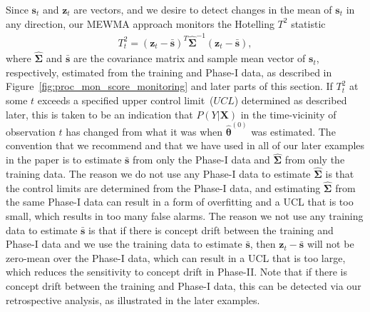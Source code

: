 \documentclass[twoside,11pt]{article}
\begin{document}
Since $\bm{s}_t$ and $\bm{z}_t$ are vectors, and we desire to detect changes in the mean of $\bm{s}_t$ in any direction, our MEWMA approach monitors the Hotelling $T^2$ statistic 
\begin{align}
T_t^2 = (\bm {z}_t-\bar { \bm {s}})^T \widehat {\bm { \Sigma}} ^{-1}(\bm {z}_t-\bar { \bm {s}}),
\label{eqn:hotellingt2}
\end{align}
where $\widehat {\bm { \Sigma}}$ and $\bar {\bm{s}}$ are the covariance matrix and sample mean vector of $\bm {s}_t$, respectively, estimated from the training and Phase-I data, as described in Figure~\ref{fig:proc_mon_score_monitoring} and later parts of this section. If $T_t^2$ at some $t$ exceeds a specified upper control limit~($UCL$) determined as described later, this is taken to be an indication that $P(Y|\bm{X})$ in the time-vicinity of observation $t$ has changed from what it was when $\hat{\bm{\theta}}^{(0)}$ was estimated. The convention that we recommend and that we have used in all of our later examples in the paper is to estimate $\bar {\bm{s}}$ from only the Phase-I data and $\widehat {\bm { \Sigma}}$ from only the training data. The reason we do not use any Phase-I data to estimate $\widehat {\bm { \Sigma}}$ is that the control limits are determined from the Phase-I data, and estimating $\widehat {\bm { \Sigma}}$ from the same Phase-I data can result in a form of overfitting and a UCL that is too small, which results in too many false alarms. The reason we not use any training data to estimate $\bar {\bm{s}}$ is that if there is concept drift between the training and Phase-I data and we use the training data to estimate $\bar { \bm {s}}$, then $\bm {z}_t-\bar { \bm {s}}$ will not be zero-mean over the Phase-I data, which can result in a UCL that is too large, which reduces the sensitivity to concept drift in Phase-II. Note that if there is concept drift between the training and Phase-I data, this can be detected via our retrospective analysis, as illustrated in the later examples. 
\end{document}
